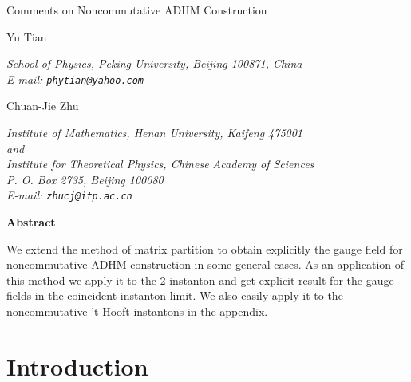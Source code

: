 \documentclass[a4paper,a4paper]{article}
\begin{document}
\providecommand{\half}{\frac{1}{2}}

\thispagestyle{empty}

\begin{center}
 {\Large
    Comments on Noncommutative ADHM Construction
 }
\end{center}

\vspace*{2cm}
\begin{center}
 \noindent
 {\large Yu Tian}
 \vspace{5mm}
 \noindent
 \hspace{0.7cm} \parbox{120mm}{\it
School of Physics, Peking University, Beijing 100871, China
\\
E-mail: {\tt phytian@yahoo.com}
 }
\end{center}
 \vspace{5mm}
\begin{center}
 \noindent
 {\large Chuan-Jie Zhu}
 \vspace{5mm}
 \noindent
 \hspace{0.7cm} \parbox{120mm}{\it
Institute of Mathematics, Henan University, Kaifeng 475001
\\
and
\\
Institute for Theoretical Physics, Chinese Academy of Sciences
\\
P. O. Box 2735, Beijing 100080
\\
E-mail: {\tt zhucj@itp.ac.cn}
 }
\end{center}

\vspace{2cm}
\begin{center}
\bf{Abstract}
\end{center}
We extend the method of matrix partition to obtain explicitly the
gauge field for noncommutative ADHM construction in some general
cases. As an application of this method we apply it to the \coordHE{}
2-instanton and get explicit result for the gauge fields in the
coincident instanton limit. We also easily apply it to the
noncommutative 't Hooft instantons in the appendix.

\newpage

\section{Introduction}
\end{document}
